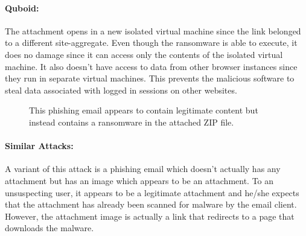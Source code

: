 \paragraph{Quboid:} The attachment opens in a new isolated virtual machine since the link belonged to a different site-aggregate. Even though the ransomware is able to execute, it does no damage since it can access only the contents of the isolated virtual machine. It also doesn't have access to data from other browser instances since they run in separate virtual machines. This prevents the malicious software to steal data associated with logged in sessions on other websites.

\begin{figure}[p]
\centering
    \caption{This phishing email appears to contain legitimate content but instead contains a ransomware in the attached ZIP file.}
   \label{fig:attack-ransomware}
\end{figure}

\paragraph{Similar Attacks:} A variant of this attack is a phishing email which doesn't actually has any attachment but has an image which appears to be an attachment. To an unsuspecting user, it appears to be a legitimate attachment and he/she expects that the attachment has already been scanned for malware by the email client. However, the attachment image is actually a link that redirects to a page that downloads the malware.

